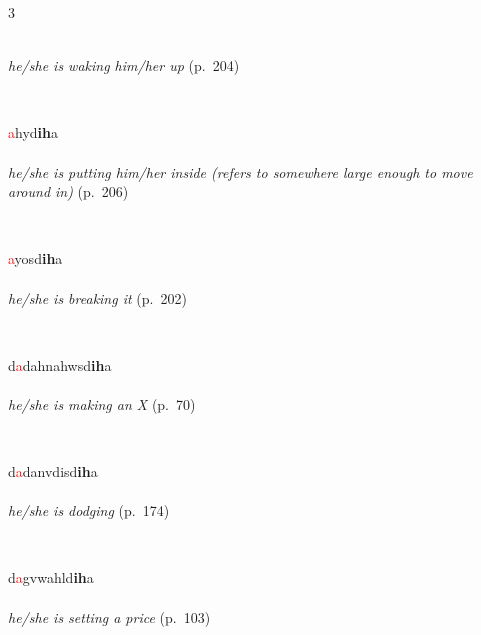 \documentclass[oneside,openany]{book}%
\begin{document}
\begin{multicols}{3}
\begin{minipage}[t]{\linewidth}
\\
\noindent \textit{he/she is waking him/her up} (p.~204)
\end{minipage}\\[1em]%
\begin{minipage}[t]{\linewidth}
\raggedright\noindent \textcolor{Red}{a}hyd\textbf{ih}a\\
\\
\noindent \textit{he/she is putting him/her inside (refers to somewhere large enough to move around in)} (p.~206)
\end{minipage}\\[1em]%
\begin{minipage}[t]{\linewidth}
\raggedright\noindent \textcolor{Red}{a}yosd\textbf{ih}a\\
\\
\noindent \textit{he/she is breaking it} (p.~202)
\end{minipage}\\[1em]%
\begin{minipage}[t]{\linewidth}
\raggedright\noindent d\textcolor{Red}{a}dahnahwsd\textbf{ih}a\\
\\
\noindent \textit{he/she is making an X} (p.~70)
\end{minipage}\\[1em]%
\begin{minipage}[t]{\linewidth}
\raggedright\noindent d\textcolor{Red}{a}danvdisd\textbf{ih}a\\
\\
\noindent \textit{he/she is dodging} (p.~174)
\end{minipage}\\[1em]%
\begin{minipage}[t]{\linewidth}
\raggedright\noindent d\textcolor{Red}{a}gvwahld\textbf{ih}a\\
\\
\noindent \textit{he/she is setting a price} (p.~103)
\end{minipage}\\[1em]%

\end{multicols}
\end{document}
